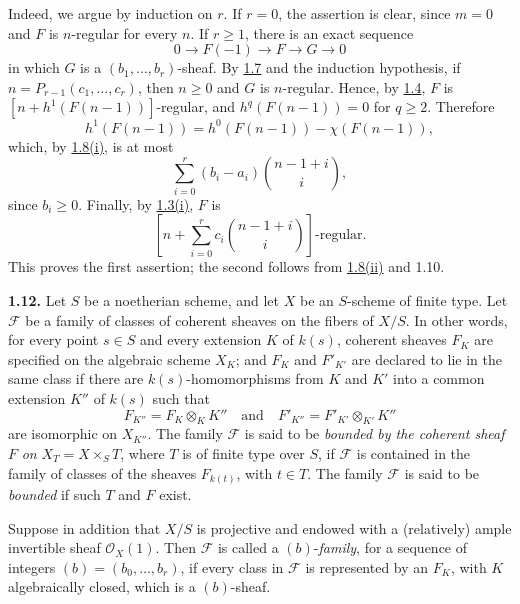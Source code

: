 \newpage
Indeed, we argue by induction on \(r\). If \(r=0\), the assertion is clear,
since \(m=0\) and \(F\) is \(n\)-regular for every \(n\). If \(r\geq1\),
there is an exact sequence
\[
  0\longrightarrow F(-1)\longrightarrow F\longrightarrow G\longrightarrow0
\]
in which \(G\) is a \((b_1,\ldots,b_r)\)-sheaf. By \hyperlink{sga6.e13.lem.1-7}{1.7} and the induction
hypothesis, if \(n=P_{r-1}(c_1,\ldots,c_r)\), then \(n\geq0\) and \(G\) is
\(n\)-regular. Hence, by \hyperlink{sga6.e13.prop.1-4}{1.4}, \(F\) is
\([n+h^1(F(n-1))]\)-regular, and \(h^q(F(n-1))=0\) for \(q\geq2\).
Therefore
\[
  h^1(F(n-1))=h^0(F(n-1))-\chi(F(n-1)),
\]
which, by \hyperlink{sga6.e13.prop.1-8}{1.8(i)}, is at most
\[
  \sum_{i=0}^{r}(b_i-a_i)\binom{n-1+i}{i},
\]
since \(b_i\geq0\). Finally, by \hyperlink{sga6.e13.prop.1-3}{1.3(i)}, \(F\) is
\[
  \left[n+\sum_{i=0}^{r}c_i\binom{n-1+i}{i}\right]\text{-regular}.
\]
This proves the first assertion; the second follows from \hyperlink{sga6.e13.prop.1-8}{1.8(ii)} and 1.10.

\textbf{1.12.} Let \(S\) be a noetherian scheme, and let \(X\) be an
\(S\)-scheme of finite type. Let \(\mathcal F\) be a family of classes of
coherent sheaves on the fibers of \(X/S\). In other words, for every point
\(s\in S\) and every extension \(K\) of \(k(s)\), coherent sheaves \(F_K\)
are specified on the algebraic scheme \(X_K\); and \(F_K\) and
\(F'_{K'}\) are declared to lie in the same class if there are
\(k(s)\)-homomorphisms from \(K\) and \(K'\) into a common extension
\(K''\) of \(k(s)\) such that
\[
  F_{K''}=F_K\otimes_KK''
  \quad\text{and}\quad
  F'_{K''}=F'_{K'}\otimes_{K'}K''
\]
are isomorphic on \(X_{K''}\). The family \(\mathcal F\) is said to be
\emph{bounded by the coherent sheaf} \(F\) \emph{on}
\(X_T=X\times_ST\), where \(T\) is of finite type over \(S\), if
\(\mathcal F\) is contained in the family of classes of the sheaves
\(F_{k(t)}\), with \(t\in T\). The family \(\mathcal F\) is said to be
\emph{bounded} if such \(T\) and \(F\) exist.

Suppose in addition that \(X/S\) is projective and endowed with a
(relatively) ample invertible sheaf \(\mathcal O_X(1)\). Then
\(\mathcal F\) is called a \((b)\)-\emph{family}, for a sequence of integers
\((b)=(b_0,\ldots,b_r)\), if every class in \(\mathcal F\) is represented
by an \(F_K\), with \(K\) algebraically closed, which is a
\((b)\)-sheaf.
